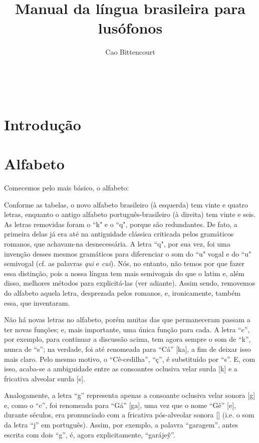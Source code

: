 \documentclass[12pt, a5paper, titlepage]{article}
\title{Manual da língua brasileira para lusófonos}
\author{Cao Bittencourt}
\date{}
\begin{document}
\maketitle
\thispagestyle{empty}

\newpage \
\thispagestyle{empty}

\newpage
\section{Introdução}

\newpage
\section{Alfabeto}\label{pt.section.abc}
Comecemos pelo mais básico, o alfabeto:

\PtTableAbc
Conforme as tabelas, o novo alfabeto brasileiro (à esquerda) tem vinte e quatro letras, enquanto o antigo alfabeto português-brasileiro (à direita) tem vinte e seis. As letras removidas foram o ``k" e o ``q", porque são redundantes. De fato, a primeira delas já era até na antiguidade clássica criticada pelos gramáticos romanos, que achavam-na desnecessária. A letra ``q", por sua vez, foi uma invenção desses mesmos gramáticos para diferenciar o som do ``u" vogal e do ``u" semivogal (cf. as palavras \textit{qui} e \textit{cui}). Nós, no entanto, não temos por que fazer essa distinção, pois a nossa língua tem mais semivogais do que o latim e, além disso, melhores métodos para explicitá-las (ver adiante). Assim sendo, removemos do alfabeto aquela letra, desprezada pelos romanos, e, ironicamente, também essa, que inventaram.

Não há novas letras no alfabeto, porém muitas das que permaneceram passam a ter
novas funções; e, mais importante, uma única função para cada. A letra ``c'',
por exemplo, para continuar a discussão acima, tem agora sempre o som de ``k'',
nunca de ``s''; na verdade, foi até renomeada para ``Cá'' [ka], a fim de deixar
isso mais claro. Pelo mesmo motivo, o ``Cê-cedilha'', ``ç'', é substituído por
``s''. E, com isso, acaba-se a ambiguidade entre as consoantes oclusiva velar
surda [k] e a fricativa alveolar surda [s].

Analogamente, a letra ``g'' representa apenas a consoante oclusiva velar sonora
    [g] e, como o ``c'', foi renomeada para ``Gá'' [ga], uma vez que o nome ``Gê''
[\textyogh e], durante séculos, era pronunciado com a fricativa pós-alveolar
sonora [\textyogh] (i.e. o som da letra ``j'' em português). Assim, por
exemplo, a palavra ``garagem'', antes escrita com dois ``g'', é, agora
explicitamente, ``garáje\~y''.
\end{document}

